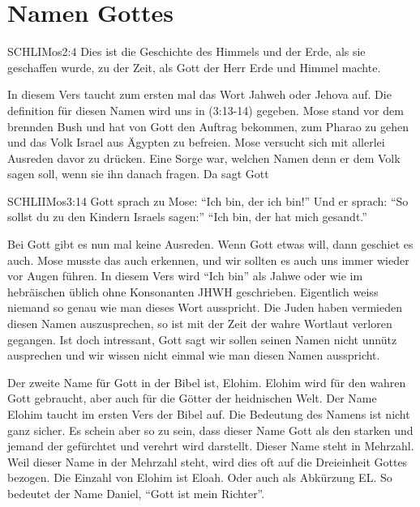 \section{Namen Gottes}
\begin{otsblock}
        \begin{bibelbox}{SCHL}{IMos}{2:4}
            Dies ist die Geschichte des Himmels und der Erde, als sie geschaffen wurde, zu der Zeit, als Gott der Herr Erde und Himmel machte.
        \end{bibelbox}
        In diesem Vers taucht zum ersten mal das Wort Jahweh oder Jehova auf. Die definition für diesen Namen wird uns in (3:13-14) gegeben. Mose stand vor dem brennden Bush und hat von Gott den Auftrag bekommen, zum Pharao zu gehen und das Volk Israel aus Ägypten zu befreien. Mose versucht sich mit allerlei Ausreden davor zu drücken. Eine Sorge war, welchen Namen denn er dem Volk sagen soll, wenn sie ihn danach fragen. Da sagt Gott
        \begin{bibelbox}{SCHL}{IIMos}{3:14}
            Gott sprach zu Mose: \enquote{Ich bin, der ich bin!} Und er sprach: \enquote{So sollst du zu den Kindern Israels sagen:} \enquote{Ich bin, der hat mich gesandt.}
        \end{bibelbox}
        Bei Gott gibt es nun mal keine Ausreden. Wenn Gott etwas will, dann geschiet es auch. Mose musste das auch erkennen, und wir sollten es auch uns immer wieder vor Augen führen.
        In diesem Vers wird \enquote{Ich bin} als Jahwe oder wie im hebräischen üblich ohne Konsonanten JHWH geschrieben. Eigentlich weiss niemand so genau wie man dieses Wort ausspricht. Die Juden haben vermieden diesen Namen auszusprechen, so ist mit der Zeit der wahre Wortlaut verloren gegangen. Ist doch intressant, Gott sagt wir sollen seinen Namen nicht unnütz ausprechen und wir wissen nicht einmal wie man diesen Namen ausspricht.

        Der zweite Name für Gott in der Bibel ist, Elohim. Elohim wird für den wahren Gott gebraucht, aber auch für die Götter der heidnischen Welt. Der Name Elohim taucht im ersten Vers der Bibel auf. Die Bedeutung des Namens ist nicht ganz sicher. Es schein aber so zu sein, dass dieser Name Gott als den starken und jemand der gefürchtet und verehrt wird darstellt. Dieser Name steht in Mehrzahl. Weil dieser Name in der Mehrzahl steht, wird dies oft auf die Dreieinheit Gottes bezogen. Die Einzahl von Elohim ist Eloah. Oder auch als Abkürzung EL. So bedeutet \zB{} der Name Daniel, \enquote{Gott ist mein Richter}.


\end{otsblock}
